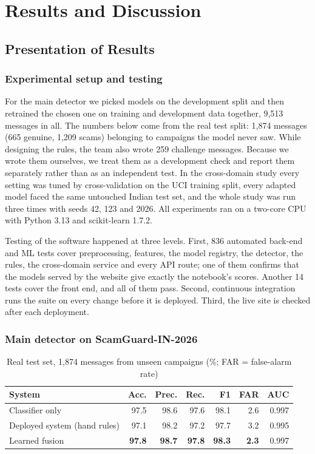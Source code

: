 \chapter{Results and Discussion}

\section{Presentation of Results}
\subsection{Experimental setup and testing}
For the main detector we picked models on the development split and then retrained the chosen one on training and development data together, 9,513 messages in all. The numbers below come from the real test split: 1,874 messages (665 genuine, 1,209 scams) belonging to campaigns the model never saw. While designing the rules, the team also wrote 259 challenge messages. Because we wrote them ourselves, we treat them as a development check and report them separately rather than as an independent test. In the cross-domain study every setting was tuned by cross-validation on the UCI training split, every adapted model faced the same untouched Indian test set, and the whole study was run three times with seeds 42, 123 and 2026. All experiments ran on a two-core CPU with Python 3.13 and scikit-learn 1.7.2.

Testing of the software happened at three levels. First, 836 automated back-end and ML tests cover preprocessing, features, the model registry, the detector, the rules, the cross-domain service and every API route; one of them confirms that the models served by the website give exactly the notebook's scores. Another 14 tests cover the front end, and all of them pass. Second, continuous integration runs the suite on every change before it is deployed. Third, the live site is checked after each deployment.

\subsection{Main detector on ScamGuard-IN-2026}
\begin{table}[H]
\centering
\caption{Real test set, 1,874 messages from unseen campaigns (\%; FAR = false-alarm rate)}
\label{tab:final}
\begin{tabular}{|l|r|r|r|r|r|r|}
\hline
\textbf{System} & \textbf{Acc.} & \textbf{Prec.} & \textbf{Rec.} & \textbf{F1} & \textbf{FAR} & \textbf{AUC} \\
\hline
Classifier only & 97.5 & 98.6 & 97.6 & 98.1 & 2.6 & 0.997 \\
\hline
Deployed system (hand rules) & 97.1 & 98.2 & 97.2 & 97.7 & 3.2 & 0.995 \\
\hline
Learned fusion & \textbf{97.8} & \textbf{98.7} & \textbf{97.8} & \textbf{98.3} & \textbf{2.3} & 0.997 \\
\hline
\end{tabular}
\end{table}

